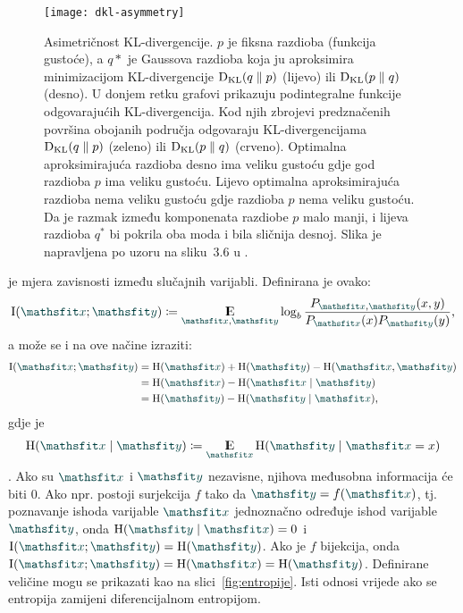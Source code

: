 \documentclass[utf8, diplomski, lmodern]{fer}
\begin{document}
\begin{figure}
	\centering
	\texttt{[image: dkl-asymmetry]}
	\caption{Asimetričnost KL-divergencije. $p$ je fiksna razdioba (funkcija gustoće), a $q*$ je Gaussova razdioba koja ju aproksimira minimizacijom KL-divergencije $\Dkl{q}{p}$ (lijevo) ili $\Dkl{p}{q}$ (desno). U donjem retku grafovi prikazuju podintegralne funkcije odgovarajućih KL-divergencija. Kod njih zbrojevi predznačenih površina obojanih područja odgovaraju KL-divergencijama $\Dkl{q}{p}$ (zeleno) ili $\Dkl{p}{q}$ (crveno). Optimalna aproksimirajuća razdioba desno ima veliku gustoću gdje god razdioba $p$ ima veliku gustoću. Lijevo optimalna aproksimirajuća razdioba nema veliku gustoću gdje razdioba $p$ nema veliku gustoću. Da je razmak između komponenata razdiobe $p$ malo manji, i lijeva razdioba $q^*$ bi pokrila oba moda i bila sličnija desnoj. Slika je napravljena po uzoru na sliku~3.6 u \citet{Goodfellow:2016:DL}.}
	\label{fig:dkl-asymmetry}
\end{figure}

 je mjera zavisnosti između slučajnih varijabli. Definirana je ovako:
\begin{align} \label{eq:mutinf}
\I\del{\rvar x;\rvar y} \coloneqq \E_{\rvar x, \rvar y} \log_b\frac{P_{\rvar x, \rvar y}(x, y)}{P_{\rvar x}(x)P_{\rvar y}(y)} \text{,}
\end{align}
a može se i na ove načine izraziti:
\begin{align}
\I(\rvar x;\rvar y)
&= \H(\rvar x)+\H(\rvar y)-\H(\rvar x, \rvar y) \label{eq:mutinf-hhh}\\
&= \H(\rvar x)-\H(\rvar x\mid \rvar y) \\
&= \H(\rvar y)-\H(\rvar y\mid\rvar x) \text{,} \label{eq:mutinf-zadnja}
\end{align}
gdje je
\begin{align}
\H(\rvar x\mid \rvar y) \coloneqq \E_{\rvar x} \H(\rvar y\mid \rvar x=x)
\label{eq:condentropy}
\end{align}
. Ako su $\rvar x$ i $\rvar y$ nezavisne, njihova međusobna informacija će biti $0$. Ako npr. postoji surjekcija $f$ tako da $\rvar y=f(\rvar x)$, tj. poznavanje ishoda varijable $\rvar x$ jednoznačno određuje ishod varijable $\rvar y$, onda $\H(\rvar y\mid\rvar x)=0$ i $\I(\rvar x;\rvar y) = \H(\rvar y)$. Ako je $f$ bijekcija, onda $\I(\rvar x;\rvar y) = \H(\rvar x) = \H(\rvar y)$. Definirane veličine mogu se prikazati kao na slici~\ref{fig:entropije}. Isti odnosi vrijede ako se entropija zamijeni diferencijalnom entropijom.
\end{document}
